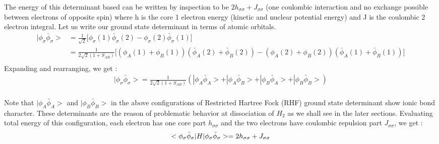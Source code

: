 \documentclass[11pt]{article}   	%
\begin{document}
	The energy of this determinant based can be written by inspection to be $2h_{\sigma \sigma} + J_{\sigma \sigma}$ (one coulombic interaction 
	and no exchange possible between electrons of opposite spin) where h is the core 1 electron energy (kinetic and nuclear potential energy)
	and J is the coulombic 2 electron integral. Let us write our ground state determinant in terms of atomic orbitals.\\
	\begin{equation}
	\begin{split}
		|\phi_{\sigma}\bar{\phi}_{\sigma}> &=\frac{1}{\sqrt{2}}\big[ \phi_{\sigma}(1)\bar{\phi}_{\sigma}(2)
				-\phi_{\sigma}(2)\bar{\phi}_{\sigma}(1)\big]\\
			&=\frac{1}{2\sqrt{2}(1+S_{AB})}\big[(\phi_A(1)+\phi_B(1))(\bar{\phi}_A(2)+\bar{\phi}
			_B(2))-(\phi_A(2)+\phi_B(2))(\bar{\phi}_A(1)+\bar{\phi}_B(1))\big]\\
	\end{split}
	\end{equation}
	Expanding and rearranging, we get :\\
	\begin{equation}
	\begin{split}
	|\phi_{\sigma}\bar{\phi}_{\sigma}>=\frac{1}{2\sqrt{2}(1+S_{AB})}(|\phi_A \bar{\phi}_A>+|\phi_A \bar{\phi}_B>+|\phi_B \bar{\phi}_A>+|\phi_B \bar{\phi}_B>)\\
	\end{split}
	\end{equation}
	
	Note that $|\phi_A \bar{\phi}_A>$ and $|\phi_B \bar{\phi}_B>$ in the above configurations of Restricted Hartree Fock (RHF) ground 
	state determinant show ionic bond character. 
	These determinants are the reason of problematic behavior at dissociation of $H_2$ as we shall see in the later sections. 
	Evaluating total energy of this configuration, each electron has one core part $h_{\sigma \sigma}$ and 
	the two electrons have coulombic repulsion part $J_{\sigma \sigma}$, we get :\\
	\begin{equation}
		<\phi_{\sigma}\bar{\phi}_{\sigma}|H|\phi_{\sigma}\bar{\phi}_{\sigma}>
		=2 h_{\sigma \sigma}+J_{\sigma \sigma}\\
	\end{equation}
	
\end{document}
